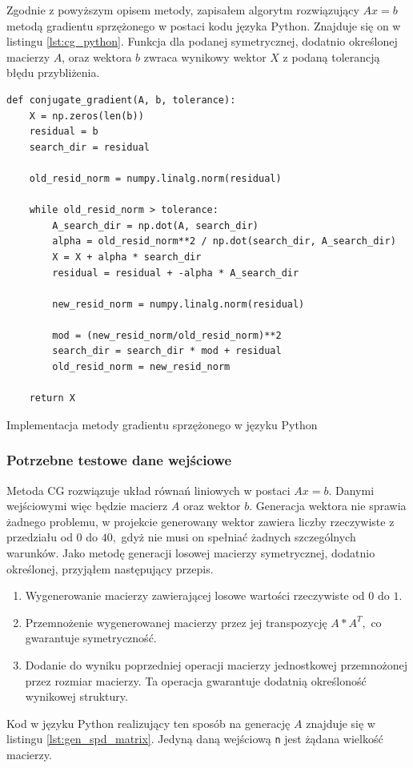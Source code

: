\documentclass[a4paper,12pt]{book} %
\begin{document}
Zgodnie z powyższym opisem metody, zapisałem algorytm rozwiązujący $Ax = b$ metodą gradientu sprzężonego w postaci kodu języka Python. Znajduje się on w listingu \ref{lst:cg_python}. Funkcja dla podanej symetrycznej, dodatnio określonej macierzy $A$, oraz wektora $b$ zwraca wynikowy wektor $X$ z podaną tolerancją błędu przybliżenia.

\begin{lstfloat}[H]
\lstset{language=Python}
\begin{lstlisting}[frame=single]
def conjugate_gradient(A, b, tolerance):
    X = np.zeros(len(b))
    residual = b
    search_dir = residual

    old_resid_norm = numpy.linalg.norm(residual)

    while old_resid_norm > tolerance:
        A_search_dir = np.dot(A, search_dir)
        alpha = old_resid_norm**2 / np.dot(search_dir, A_search_dir)
        X = X + alpha * search_dir
        residual = residual + -alpha * A_search_dir

        new_resid_norm = numpy.linalg.norm(residual)

        mod = (new_resid_norm/old_resid_norm)**2
        search_dir = search_dir * mod + residual
        old_resid_norm = new_resid_norm

    return X
\end{lstlisting}
\caption{Implementacja metody gradientu sprzężonego w języku Python}
\label{lst:cg_python}
\end{lstfloat}

\subsubsection{Potrzebne testowe dane wejściowe}
Metoda CG rozwiązuje układ równań liniowych w postaci $Ax = b.$ Danymi wejściowymi więc będzie macierz $A$ oraz wektor $b$. Generacja wektora nie sprawia żadnego problemu, w projekcie generowany wektor zawiera liczby rzeczywiste z przedziału od $0$ do $40,$ gdyż nie musi on spełniać żadnych szczególnych warunków.
Jako metodę generacji losowej macierzy symetrycznej, dodatnio określonej, przyjąłem następujący przepis.
\begin{enumerate}
		\item Wygenerowanie macierzy zawierającej losowe wartości rzeczywiste od $0$ do $1.$
		\item Przemnożenie wygenerowanej macierzy przez jej transpozycję $A * A^T,$ co gwarantuje symetryczność.
		\item Dodanie do wyniku poprzedniej operacji macierzy jednostkowej przemnożonej przez rozmiar macierzy. Ta operacja gwarantuje dodatnią określoność wynikowej struktury.
\end{enumerate}
Kod w języku Python realizujący ten sposób na generację $A$ znajduje się w listingu \ref{lst:gen_spd_matrix}. Jedyną daną wejściową \texttt{n} jest żądana wielkość macierzy.
\end{document}

